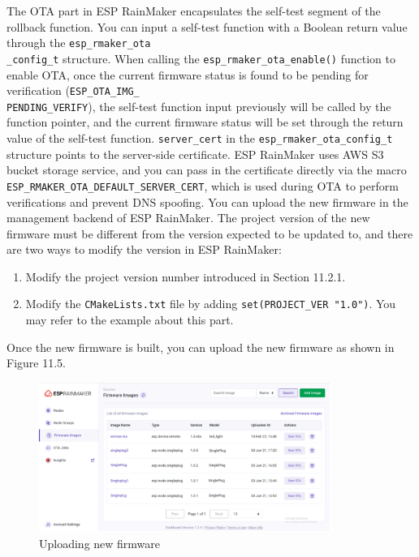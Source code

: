 \documentclass[a4paper,12pt,openany]{book}
\begin{document}
The OTA part in ESP RainMaker encapsulates the self-test segment of the rollback function. You can input a self-test function with a Boolean return value through the \verb|esp_rmaker_ota|\\ \verb|_config_t| structure. When calling the \verb|esp_rmaker_ota_enable()| function to enable OTA, once the current firmware status is found to be pending for verification (\verb|ESP_OTA_IMG_|\\ \verb|PENDING_VERIFY|), the self-test function input previously will be called by the function pointer, and the current firmware status will be set through the return value of the self-test function. \verb|server_cert| in the \verb|esp_rmaker_ota_config_t| structure points to the server-side certificate. ESP RainMaker uses AWS S3 bucket storage service, and you can pass in the certificate directly via the macro \verb|ESP_RMAKER_OTA_DEFAULT_SERVER_CERT|, which is used during OTA to perform verifications and prevent DNS spoofing. You can upload the new firmware in the management backend of ESP RainMaker. The project version of the new firmware must be different from the version expected to be updated to, and there are two ways to modify the version in ESP RainMaker:

\begin{enumerate}[label=(\arabic*)]
    \item Modify the project version number introduced in Section 11.2.1.
    \item Modify the \verb|CMakeLists.txt| file by adding \verb|set(PROJECT_VER "1.0")|. You may refer to the example about this part.
\end{enumerate}

Once the new firmware is built, you can upload the new firmware as shown in Figure 11.5.

\begin{figure}[h!]
    \centering
    \includegraphics[width=0.85\textwidth,frame]{D11Z/11-5}
    \caption{Uploading new firmware}
\end{figure}
\end{document}
